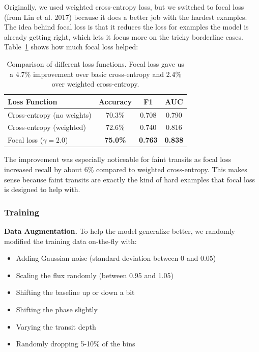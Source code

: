 \documentclass[letterpaper]{article} %
\begin{document}
Originally, we used weighted cross-entropy loss, but we switched to focal loss (from Lin et al. 2017) because it does a better job with the hardest examples. The idea behind focal loss is that it reduces the loss for examples the model is already getting right, which lets it focus more on the tricky borderline cases. Table~\ref{tab:focal_comparison} shows how much focal loss helped:

\begin{table}[H]
\centering
\begin{tabular}{lccc}
\hline
\textbf{Loss Function} & \textbf{Accuracy} & \textbf{F1} & \textbf{AUC} \\
\hline
Cross-entropy (no weights) & 70.3\% & 0.708 & 0.790 \\
Cross-entropy (weighted) & 72.6\% & 0.740 & 0.816 \\
Focal loss ($\gamma=2.0$) & \textbf{75.0\%} & \textbf{0.763} & \textbf{0.838} \\
\hline
\end{tabular}
\caption{Comparison of different loss functions. Focal loss gave us a 4.7\% improvement over basic cross-entropy and 2.4\% over weighted cross-entropy.}
\label{tab:focal_comparison}
\end{table}

The improvement was especially noticeable for faint transits as focal loss increased recall by about 6\% compared to weighted cross-entropy. This makes sense because faint transits are exactly the kind of hard examples that focal loss is designed to help with.

\subsubsection{Training}

\textbf{Data Augmentation.} To help the model generalize better, we randomly modified the training data on-the-fly with:
\begin{itemize}
    \item Adding Gaussian noise (standard deviation between 0 and 0.05)
    \item Scaling the flux randomly (between 0.95 and 1.05)
    \item Shifting the baseline up or down a bit
    \item Shifting the phase slightly
    \item Varying the transit depth
    \item Randomly dropping 5-10\% of the bins
\end{itemize}
\end{document}
